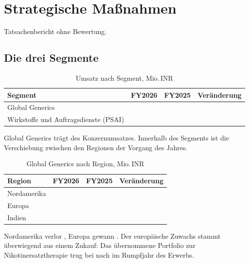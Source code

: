 \section{Strategische Ma{\ss}nahmen}
\label{sec:strategie-rdy}

Tatsachenbericht ohne Bewertung.

\subsection{Die drei Segmente}

\begin{table}[htbp]
\centering
\caption{Umsatz nach Segment, Mio.\,INR}
\label{tab:rdy-segmente}
\begin{tabular}{lrrr}
\toprule
Segment & FY2026 & FY2025 & Ver\"anderung\\
\midrule
Global Generics                       & \Betrag{\RdyGlobalGenerics} & \Betrag{\RdyGlobalGenericsVJ} & \Pct{\RdyGlobalGenericsWachstum}\\
Wirkstoffe und Auftragsdienste (PSAI) & \Betrag{\RdyPsai} & \Betrag{\RdyPsaiVJ} & \Pct{\RdyPsaiWachstum}\\
\bottomrule
\end{tabular}
\end{table}

Global Generics tr\"agt \Pct{\RdyGlobalGenericsAnteil} des
Konzernumsatzes.
Innerhalb des Segments ist die Verschiebung zwischen den Regionen der Vorgang
des Jahres.

\begin{table}[htbp]
\centering
\caption{Global Generics nach Region, Mio.\,INR}
\label{tab:rdy-regionen}
\begin{tabular}{lrrr}
\toprule
Region & FY2026 & FY2025 & Ver\"anderung\\
\midrule
Nordamerika & \Betrag{\RdyNordamerika} & \Betrag{\RdyNordamerikaVJ} & \Pct{\RdyNordamerikaWachstum}\\
Europa      & \Betrag{\RdyEuropa} & \Betrag{\RdyEuropaVJ} & \Pct{\RdyEuropaWachstum}\\
Indien      & \Betrag{\RdyIndien} & \Betrag{\RdyIndienVJ} & \Pct{\RdyIndienWachstum}\\
\bottomrule
\end{tabular}
\end{table}

Nordamerika verlor \MioINR{\RdyNordamerikaRueckgang}, Europa gewann
\MioINR{\RdyEuropaZuwachs}.
Der europ\"aische Zuwachs stammt \"uberwiegend aus einem Zukauf: Das
\"ubernommene Portfolio zur Nikotinersatztherapie trug
\MioINR{\RdyNrtUmsatz} bei nach \MioINR{\RdyNrtUmsatzVJ} im Rumpfjahr des
Erwerbs.

